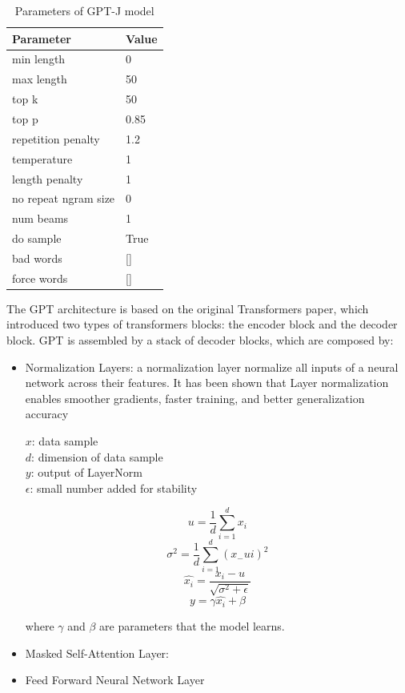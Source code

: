 \documentclass{article}
\begin{document}
\begin{table}[h] 
\centering
\begin{tabular}{|l|l|}
\hline
Parameter          & Value \\ \hline
min length         & 0    \\ 
max length         & 50    \\ 
top k              & 50    \\
top p              & 0.85  \\
repetition penalty & 1.2   \\
temperature        & 1     \\
length penalty     & 1     \\
no repeat ngram size     & 0     \\
num beams &  1 \\
do sample & True \\
bad words & [\space] \\
force words & [\space] \\ \hline
\end{tabular}
\caption{Parameters of GPT-J model}\label{table:parametersGPTJTable}
\end{table}

The GPT architecture is based on the original Transformers paper, which introduced two types of transformers blocks: the encoder block and the decoder block. GPT is assembled by a stack of decoder blocks, which are composed by:
\begin{itemize}
    \item Normalization Layers: a normalization layer \cite{ba2016layer}  normalize all inputs of a neural network across their features. It has been shown that Layer normalization enables smoother gradients, faster training, and better
    generalization accuracy \cite{xu2019understanding}

    $x$: data sample \\
    $d$: dimension of data sample \\
    $y$: output of LayerNorm \\
    $\epsilon$: small number added for stability

    \begin{equation}
        u = \frac{1}{d}\sum_{i=1}^{d}x_i 
    \end{equation}
    \begin{equation}
        \sigma^2 = \frac{1}{d}\sum_{i=1}^{d}(x_ - ui)^2
    \end{equation}
    \begin{equation}
        \hat{x_i} = \frac{x_i - u}{\sqrt{\sigma^2 + \epsilon}}
    \end{equation}
    \begin{equation}
        y = \gamma\hat{x_i} + \beta
    \end{equation}

    where $\gamma$ and $\beta$ are parameters that the model learns.
    \item Masked Self-Attention Layer: 
    \item Feed Forward Neural Network Layer
\end{itemize}
\end{document}
